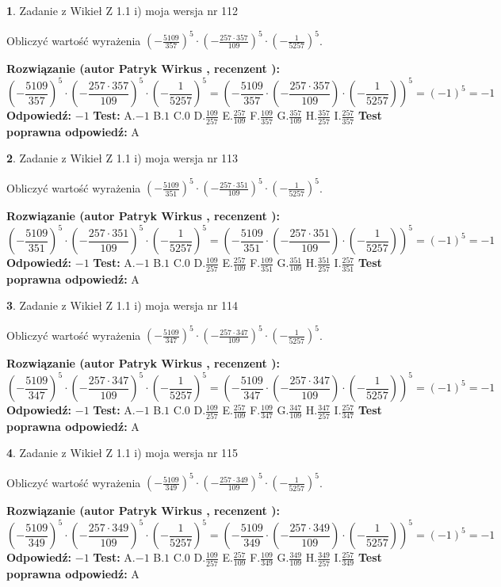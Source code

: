 \documentclass[12pt, a4paper]{article}
\theoremstyle{definition} %
\newtheorem{zad}{}
\newcommand{\zadStart}[1]{\begin{zad}#1\newline}
\newcommand{\zadStop}{\end{zad}}
\newcommand{\rozwStart}[2]{\noindent \textbf{Rozwiązanie (autor #1 , recenzent #2): }\newline}
\newcommand{\rozwStop}{\newline}
\newcommand{\odpStart}{\noindent \textbf{Odpowiedź:}\newline}
\newcommand{\odpStop}{\newline}
\newcommand{\testStart}{\noindent \textbf{Test:}\newline}
\newcommand{\testStop}{\newline}
\newcommand{\kluczStart}{\noindent \textbf{Test poprawna odpowiedź:}\newline}
\newcommand{\kluczStop}{\newline}
\begin{document}
\zadStart{Zadanie z Wikieł Z 1.1 i) moja wersja nr 112}

Obliczyć wartość wyrażenia $(-\frac{5109}{357})^{5} \cdot (-\frac{257 \cdot 357}{109})^{5} \cdot (-\frac{1}{5257})^{5}$.
\zadStop
\rozwStart{Patryk Wirkus}{}
$$(-\frac{5109}{357})^{5} \cdot (-\frac{257 \cdot 357}{109})^{5} \cdot (-\frac{1}{5257})^{5} = (-\frac{5109}{357} \cdot (-\frac{257 \cdot 357}{109}) \cdot (-\frac{1}{5257}))^{5} = (-1)^{5} = -1$$
\rozwStop
\odpStart
$-1$
\odpStop
\testStart
A.$-1$ B.$1$ C.$0$ D.$\frac{109}{257}$ E.$\frac{257}{109}$
F.$\frac{109}{357}$ G.$\frac{357}{109}$
H.$\frac{357}{257}$
I.$\frac{257}{357}$
\testStop
\kluczStart
A
\kluczStop



\zadStart{Zadanie z Wikieł Z 1.1 i) moja wersja nr 113}

Obliczyć wartość wyrażenia $(-\frac{5109}{351})^{5} \cdot (-\frac{257 \cdot 351}{109})^{5} \cdot (-\frac{1}{5257})^{5}$.
\zadStop
\rozwStart{Patryk Wirkus}{}
$$(-\frac{5109}{351})^{5} \cdot (-\frac{257 \cdot 351}{109})^{5} \cdot (-\frac{1}{5257})^{5} = (-\frac{5109}{351} \cdot (-\frac{257 \cdot 351}{109}) \cdot (-\frac{1}{5257}))^{5} = (-1)^{5} = -1$$
\rozwStop
\odpStart
$-1$
\odpStop
\testStart
A.$-1$ B.$1$ C.$0$ D.$\frac{109}{257}$ E.$\frac{257}{109}$
F.$\frac{109}{351}$ G.$\frac{351}{109}$
H.$\frac{351}{257}$
I.$\frac{257}{351}$
\testStop
\kluczStart
A
\kluczStop



\zadStart{Zadanie z Wikieł Z 1.1 i) moja wersja nr 114}

Obliczyć wartość wyrażenia $(-\frac{5109}{347})^{5} \cdot (-\frac{257 \cdot 347}{109})^{5} \cdot (-\frac{1}{5257})^{5}$.
\zadStop
\rozwStart{Patryk Wirkus}{}
$$(-\frac{5109}{347})^{5} \cdot (-\frac{257 \cdot 347}{109})^{5} \cdot (-\frac{1}{5257})^{5} = (-\frac{5109}{347} \cdot (-\frac{257 \cdot 347}{109}) \cdot (-\frac{1}{5257}))^{5} = (-1)^{5} = -1$$
\rozwStop
\odpStart
$-1$
\odpStop
\testStart
A.$-1$ B.$1$ C.$0$ D.$\frac{109}{257}$ E.$\frac{257}{109}$
F.$\frac{109}{347}$ G.$\frac{347}{109}$
H.$\frac{347}{257}$
I.$\frac{257}{347}$
\testStop
\kluczStart
A
\kluczStop



\zadStart{Zadanie z Wikieł Z 1.1 i) moja wersja nr 115}

Obliczyć wartość wyrażenia $(-\frac{5109}{349})^{5} \cdot (-\frac{257 \cdot 349}{109})^{5} \cdot (-\frac{1}{5257})^{5}$.
\zadStop
\rozwStart{Patryk Wirkus}{}
$$(-\frac{5109}{349})^{5} \cdot (-\frac{257 \cdot 349}{109})^{5} \cdot (-\frac{1}{5257})^{5} = (-\frac{5109}{349} \cdot (-\frac{257 \cdot 349}{109}) \cdot (-\frac{1}{5257}))^{5} = (-1)^{5} = -1$$
\rozwStop
\odpStart
$-1$
\odpStop
\testStart
A.$-1$ B.$1$ C.$0$ D.$\frac{109}{257}$ E.$\frac{257}{109}$
F.$\frac{109}{349}$ G.$\frac{349}{109}$
H.$\frac{349}{257}$
I.$\frac{257}{349}$
\testStop
\kluczStart
A
\kluczStop
\end{document}
